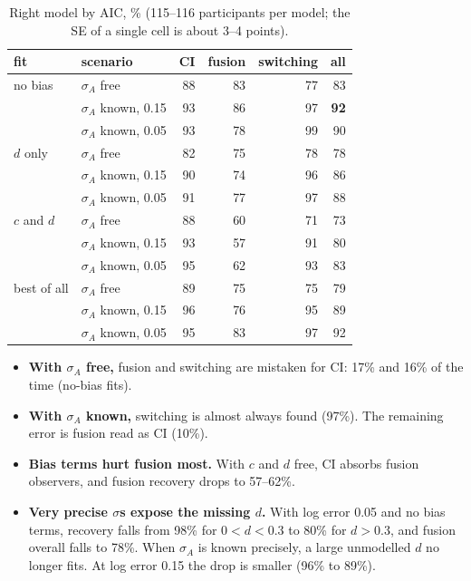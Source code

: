 \documentclass[11pt,a4paper]{article}
\begin{document}
\begin{table}[H]
\centering\small
\begin{tabular}{llrrrr}
\toprule
fit & scenario & CI & fusion & switching & all \\
\midrule
no bias & $\sigma_A$ free & 88 & 83 & 77 & 83 \\
        & $\sigma_A$ known, 0.15 & 93 & 86 & 97 & \textbf{92} \\
        & $\sigma_A$ known, 0.05 & 93 & 78 & 99 & 90 \\
\midrule
$d$ only & $\sigma_A$ free & 82 & 75 & 78 & 78 \\
         & $\sigma_A$ known, 0.15 & 90 & 74 & 96 & 86 \\
         & $\sigma_A$ known, 0.05 & 91 & 77 & 97 & 88 \\
\midrule
$c$ and $d$ & $\sigma_A$ free & 88 & 60 & 71 & 73 \\
            & $\sigma_A$ known, 0.15 & 93 & 57 & 91 & 80 \\
            & $\sigma_A$ known, 0.05 & 95 & 62 & 93 & 83 \\
\midrule
best of all & $\sigma_A$ free & 89 & 75 & 75 & 79 \\
            & $\sigma_A$ known, 0.15 & 96 & 76 & 95 & 89 \\
            & $\sigma_A$ known, 0.05 & 95 & 83 & 97 & 92 \\
\bottomrule
\end{tabular}
\caption{Right model by AIC, \% (115--116 participants per model; the SE of a single cell is about 3--4 points).}
\label{tab:modelrec}
\end{table}

\begin{itemize}
\item \textbf{With $\sigma_A$ free,} fusion and switching are mistaken for CI: 17\% and 16\% of the time (no-bias fits).
\item \textbf{With $\sigma_A$ known,} switching is almost always found (97\%). The remaining error is fusion read as CI (10\%).
\item \textbf{Bias terms hurt fusion most.} With $c$ and $d$ free, CI absorbs fusion observers, and fusion recovery drops to 57--62\%.
\item \textbf{Very precise $\sigma$s expose the missing $d$.} With log error 0.05 and no bias terms, recovery falls from 98\% for $0 < d < 0.3$ to 80\% for $d > 0.3$, and fusion overall falls to 78\%. When $\sigma_A$ is known precisely, a large unmodelled $d$ no longer fits. At log error 0.15 the drop is smaller (96\% to 89\%).
\end{itemize}
\end{document}
